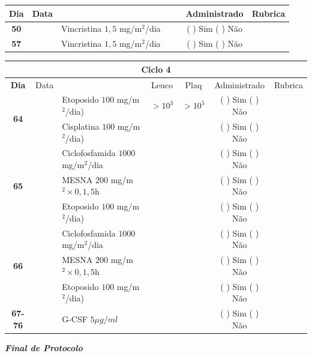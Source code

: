 \documentclass[11pt,a4paper,oldfontcommands]{memoir}
\begin{document}
\begin{center}
\begin{table}[H]
\begin{tabular}{p{1cm}c|p{4cm}|p{2cm}p{2cm}|c|c}
	\hline
	\multicolumn{1}{c|}{\multirow{1}{*}{\textbf{Dia}}}&{Data}&{}&{}&&{Administrado}&{Rubrica} \\
    \hline
    \multicolumn{1}{c|}{\textbf{50}}&&{Vincristina \(1,5\) mg/m\(^2\)/dia}&\multicolumn{1}{c}{}&&{(  ) Sim (  ) Não}&\\
    \hline
    \multicolumn{1}{c|}{\textbf{57}}&&{Vincristina \(1,5\) mg/m\(^2\)/dia}&\multicolumn{1}{c}{}&&{(  ) Sim (  ) Não}&\\
    \hline
\end{tabular}
\end{table}
\begin{table}[H] \small
\begin{tabular}{p{1cm}c|p{4.8cm}|p{1.5cm}p{1.5cm}|c|c}
	\hline
	\multicolumn{7}{c}{Ciclo 4} \\
	\hline
	\multicolumn{1}{c|}{\multirow{1}{*}{\textbf{Dia}}}&{Data}&{}&\multicolumn{1}{c|}{Leuco}&\multicolumn{1}{c|}{Plaq}&{Administrado}&{Rubrica} \\
    \hline
    \multicolumn{1}{c|}{\multirow{2}{*}{\textbf{64}}}&&{Etoposido \(100\) mg/m\(^2\)/dia)}&\multicolumn{1}{c|}{\(>10^3\)}&\multicolumn{1}{c|}{\(>10^5\)}&{(  ) Sim (  ) Não}&\\
    \cline{4-5}
    \multicolumn{1}{c|}{}&\multirow{1}{*}{}&{Cisplatina \(100\) mg/m\(^2\)/dia)}&&&{(  ) Sim (  ) Não}&\\
    \hline
    \multicolumn{1}{c|}{\multirow{3}{*}{\textbf{65}}}&&{Ciclofosfamida \(1000\) mg/m\(^2\)/dia}&{}&&{(  ) Sim (  ) Não}&\\
    \multicolumn{1}{c|}{}&&{MESNA \(200\) mg/m\(^2 \times 0,1,5\)h}&&&{(  ) Sim (  ) Não}&\\
    \multicolumn{1}{c|}{}&&{Etoposido \(100\) mg/m\(^2\)/dia)}&&&{(  ) Sim (  ) Não}&\\
    \hline
    \multicolumn{1}{c|}{\multirow{3}{*}{\textbf{66}}}&&{Ciclofosfamida \(1000\) mg/m\(^2\)/dia}&{}&&{(  ) Sim (  ) Não}&\\
    \multicolumn{1}{c|}{}&&{MESNA \(200\) mg/m\(^2 \times 0,1,5\)h}&&&{(  ) Sim (  ) Não}&\\
    \multicolumn{1}{c|}{}&\multirow{1}{*}{}&{Etoposido \(100\) mg/m\(^2\)/dia)}&{}&&{(  ) Sim (  ) Não}&\\
    \hline
    \multicolumn{1}{c|}{\textbf{67-76}}&&{G-CSF \(5 \mu g/ml\) }&&&{(  ) Sim (  ) Não}&\\
    \hline
\end{tabular}
\end{table}
\textit{\textbf{Final de Protocolo}}
\end{center}
\end{document}
